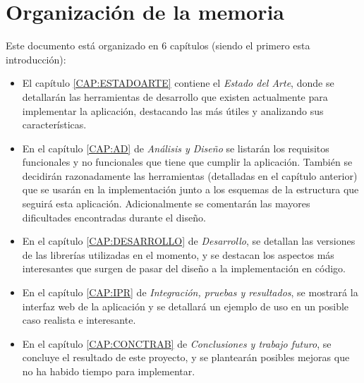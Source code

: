   
  \section{Organización de la memoria\label{SEC:ORGANIZACION}}
    Este documento está organizado en 6 capítulos (siendo el primero esta introducción): 
    \begin{itemize}
      \item El capítulo \ref{CAP:ESTADOARTE} contiene el \textit{Estado del Arte}, donde se detallarán las herramientas de desarrollo que existen actualmente para implementar la aplicación, destacando las más útiles y analizando sus características.
      
      \item En el capítulo \ref{CAP:AD} de \textit{Análisis y Diseño} se listarán los requisitos funcionales y no funcionales que tiene que cumplir la aplicación. También se decidirán razonadamente las herramientas (detalladas en el capítulo anterior) que se usarán en la implementación junto a los esquemas de la estructura que seguirá esta aplicación. Adicionalmente se comentarán las mayores dificultades encontradas durante el diseño.
      
      \item En el capítulo \ref{CAP:DESARROLLO} de \textit{Desarrollo}, se detallan las versiones de las librerías utilizadas en el momento, y se destacan los aspectos más interesantes que surgen de pasar del diseño a la implementación en código.
      
      \item En el capítulo \ref{CAP:IPR} de \textit{Integración, pruebas y resultados}, se mostrará la interfaz web de la aplicación y se detallará un ejemplo de uso en un posible caso realista e interesante.
      
      \item En el capítulo \ref{CAP:CONCTRAB} de \textit{Conclusiones y trabajo futuro}, se concluye el resultado de este proyecto, y se plantearán posibles mejoras que no ha habido tiempo para implementar.
    \end{itemize}
    
    
